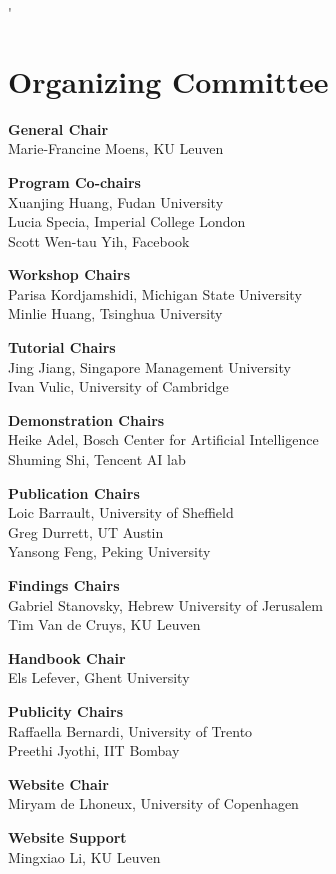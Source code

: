 \markboth{}{} %
\markright{}{} %
\'
\section{Organizing Committee}{}

\setlength{\parindent}{0pt}

{\bf General Chair} \\
Marie-Francine Moens, KU Leuven

{\bf Program Co-chairs} \\
Xuanjing Huang, Fudan University\\
Lucia Specia, Imperial College London\\
Scott Wen-tau Yih, Facebook

{\bf Workshop Chairs} \\
Parisa Kordjamshidi, Michigan State University\\
Minlie Huang, Tsinghua University

{\bf Tutorial Chairs} \\
Jing Jiang, Singapore Management University \\
Ivan Vulic, University of Cambridge

{\bf Demonstration Chairs} \\
Heike Adel, Bosch Center for Artificial Intelligence \\
Shuming Shi, Tencent AI lab

{\bf Publication Chairs} \\
Loic Barrault, University of Sheffield \\
Greg Durrett, UT Austin \\
Yansong Feng, Peking University

{\bf Findings Chairs} \\
Gabriel Stanovsky, Hebrew University of Jerusalem \\
Tim Van de Cruys, KU Leuven

{\bf Handbook Chair} \\
Els Lefever, Ghent University

{\bf Publicity Chairs} \\
Raffaella Bernardi, University of Trento \\
Preethi Jyothi, IIT Bombay

{\bf Website Chair} \\
Miryam de Lhoneux, University of Copenhagen

{\bf Website Support} \\
Mingxiao Li, KU Leuven

